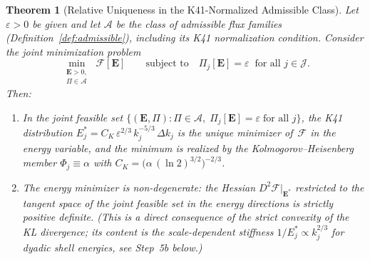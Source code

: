 \documentclass[12pt,a4paper]{article}
\theoremstyle{definition}
\theoremstyle{plain}
\newtheorem{theorem}[definition]{Theorem}
\theoremstyle{remark}
\begin{document}
\begin{theorem}[Relative Uniqueness in the K41-Normalized Admissible Class]\label{thm:K41}
Let $\varepsilon > 0$ be given and let $\mathscr{A}$ be the class of
admissible flux families (Definition~\ref{def:admissible}), including its
K41 normalization condition.
Consider the \emph{joint} minimization problem
\begin{equation}\label{eq:min}
  \min_{\substack{\mathbf{E} > 0,\\ \Pi \in \mathscr{A}}}
  \;\mathcal{F}[\mathbf{E}]
  \qquad \text{subject to} \quad
  \Pi_j[\mathbf{E}] = \varepsilon
  \;\;\text{for all } j \in \mathcal{J}.
\end{equation}
Then:
\begin{enumerate}
  \item[\textup{(i)}]
    In the joint feasible set
    $\{(\mathbf{E},\Pi):\Pi\in\mathscr{A},\;
    \Pi_j[\mathbf{E}]=\varepsilon\;\text{for all }j\}$, the K41
    distribution
    $E_j^* = C_K\,\varepsilon^{2/3}\,k_j^{-5/3}\,\Delta k_j$
    is the unique minimizer of~$\mathcal{F}$ in the energy variable, and
    the minimum is realized
    by the Kolmogorov--Heisenberg member $\Phi_j \equiv \alpha$ with
    $C_K = \bigl(\alpha\,(\ln 2)^{3/2}\bigr)^{-2/3}$.
  \item[\textup{(ii)}]
    The energy minimizer is non-degenerate: the Hessian
    $D^2\mathcal{F}|_{\mathbf{E}^*}$ restricted to the tangent space of
    the joint feasible set in the energy directions is strictly positive
    definite. (This is a direct consequence of the strict convexity of
    the KL divergence; its content is the scale-dependent stiffness
    $1/E_j^* \propto k_j^{2/3}$ for dyadic shell energies, see Step~5b below.)
\end{enumerate}
\end{theorem}
\end{document}
